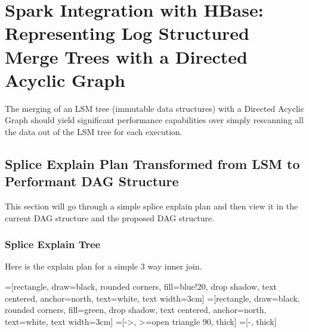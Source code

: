 \section{Spark Integration with HBase: Representing Log Structured Merge Trees
with a Directed Acyclic Graph}
The merging of an LSM tree (immutable data structures) with a Directed Acyclic
Graph should yield significant performance capabilities over simply rescanning
all the data out of the LSM tree for each execution.  

\subsection{Splice Explain Plan Transformed from LSM to Performant DAG
Structure} This section will go through a simple splice explain plan and then
view it in the current DAG structure and the proposed DAG structure.

\subsubsection{Splice Explain Tree}
Here is the explain plan for a simple 3 way inner join.

=[rectangle, draw=black, rounded corners, fill=blue!20, drop
shadow, text centered, anchor=north, text=white, text width=3cm]
=[rectangle, draw=black, rounded corners, fill=green, drop shadow,
        text centered, anchor=north, text=white, text width=3cm]
=[->, >=open triangle 90, thick]
=[-, thick]
        
\begin{center}
\end{center}

